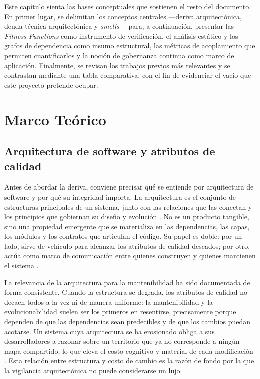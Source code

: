 
Este capítulo sienta las bases conceptuales que sostienen el resto del documento. En primer lugar, se delimitan los conceptos centrales —deriva arquitectónica, deuda técnica arquitectónica y \textit{smells}— para, a continuación, presentar las \textit{Fitness Functions} como instrumento de verificación, el análisis estático y los grafos de dependencia como insumo estructural, las métricas de acoplamiento que permiten cuantificarlos y la noción de gobernanza continua como marco de aplicación. Finalmente, se revisan los trabajos previos más relevantes y se contrastan mediante una tabla comparativa, con el fin de evidenciar el vacío que este proyecto pretende ocupar.

\section{Marco Teórico}

\subsection{Arquitectura de software y atributos de calidad}
Antes de abordar la deriva, conviene precisar qué se entiende por arquitectura de software y por qué su integridad importa. La arquitectura es el conjunto de estructuras principales de un sistema, junto con las relaciones que las conectan y los principios que gobiernan su diseño y evolución \citep{Bass2012}. No es un producto tangible, sino una propiedad emergente que se materializa en las dependencias, las capas, los módulos y los contratos que articulan el código. Su papel es doble: por un lado, sirve de vehículo para alcanzar los atributos de calidad deseados; por otro, actúa como marco de comunicación entre quienes construyen y quienes mantienen el sistema \citep{PerryWolf1992}.

La relevancia de la arquitectura para la mantenibilidad ha sido documentada de forma consistente. Cuando la estructura se degrada, los atributos de calidad no decaen todos a la vez ni de manera uniforme: la mantenibilidad y la evolucionabilidad suelen ser los primeros en resentirse, precisamente porque dependen de que las dependencias sean predecibles y de que los cambios puedan acotarse. Un sistema cuya arquitectura se ha erosionado obliga a sus desarrolladores a razonar sobre un territorio que ya no corresponde a ningún mapa compartido, lo que eleva el costo cognitivo y material de cada modificación \citep{Klein2022}. Esta relación entre estructura y costo de cambio es la razón de fondo por la que la vigilancia arquitectónica no puede considerarse un lujo.

